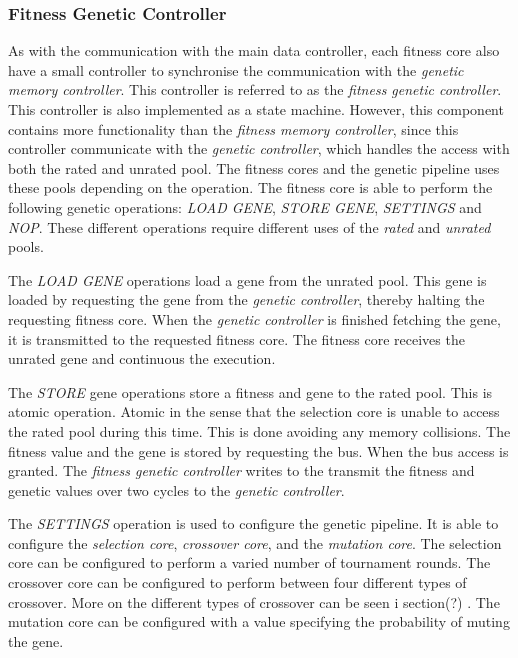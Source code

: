 \subsubsection{Fitness Genetic Controller} 
As with the communication with the main data controller, each fitness core also have a small controller to synchronise the communication with the \emph{genetic memory controller}. This controller is referred to as the \emph{fitness genetic controller}. This controller is also implemented as a state machine. However, this component contains more functionality than the \emph{fitness memory controller}, since this controller communicate with the \emph{genetic controller}, which handles the access with both the rated and unrated pool. The fitness cores and the genetic pipeline uses these pools depending on the operation. The fitness core is able to perform the following genetic operations: \emph{LOAD GENE}, \emph{STORE GENE}, \emph{SETTINGS} and \emph{NOP}. These different operations require different uses of the \emph{rated} and \emph{unrated} pools. 

The \emph{LOAD GENE} operations load a gene from the unrated pool. This gene is loaded by requesting the gene from the \emph{genetic controller}, thereby halting the requesting fitness core. When the \emph{genetic controller} is finished fetching the gene, it is transmitted to the requested fitness core. The fitness core receives the unrated gene and continuous the execution.

The \emph{STORE} gene operations store a fitness and gene to the rated pool. This is atomic operation. Atomic in the sense that the selection core is unable to access the rated pool during this time. This is done avoiding any memory collisions. The fitness value and the gene is stored by requesting the bus. When the bus access is granted. The \emph{fitness genetic controller} writes to the transmit the fitness and genetic values over two cycles to the \emph{genetic controller}.  

The \emph{SETTINGS} operation is used to configure the genetic pipeline. It is able to configure the \emph{selection core}, \emph{crossover core}, and the \emph{mutation core}. The selection core can be configured to perform a varied number of tournament rounds. The crossover core can be configured to perform between four different types of crossover. More on the different types of crossover can be seen i section(?) . The mutation core can be configured with a value specifying the probability of muting the gene. 

